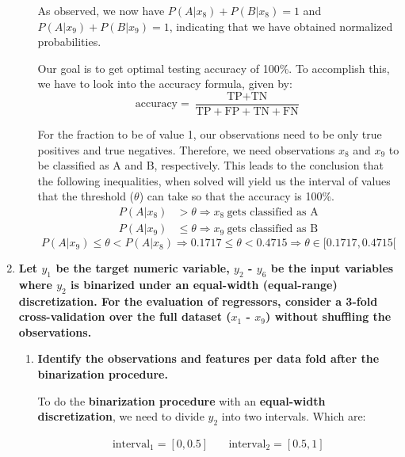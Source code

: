 \documentclass[12pt]{article}
\begin{document}
\begin{enumerate}[leftmargin=\labelsep]
\begin{enumerate}
          As observed, we now have $P(A | x_8) + P(B | x_8) = 1$ and $P(A | x_9) + P(B | x_9) = 1$, indicating that we have obtained normalized probabilities.

          Our goal is to get optimal testing accuracy of 100\%. To accomplish this, we have to look into the accuracy formula, given by:
          $$
            \text{accuracy} = \frac{\text{TP} + \text{TN}}{\text{TP} + \text{FP} + \text{TN} + \text{FN}}
          $$

          For the fraction to be of value 1, our observations need to be only true positives and true negatives. Therefore, we need observations $x_8$ and $x_9$ to be classified as A and B, respectively.
          This leads to the conclusion that the following inequalities, when solved will yield us the interval of values that the threshold ($\theta$) can take so that the accuracy is 100\%.
          \[
              \begin{aligned}
                  P(A | x_8) & > \theta \Rightarrow x_8 \ \text{gets classified as A} \\
                  P(A | x_9) & \leq \theta \Rightarrow x_9 \ \text{gets classified as B}
              \end{aligned}
          \]
          \begin{equation}
              P(A | x_9) \leq \theta < P(A | x_8) \Rightarrow 0.1717 \leq \theta < 0.4715 \Rightarrow \theta \in [0.1717, 0.4715[
          \end{equation}

          \end{enumerate}

    \item \textbf{Let $y_1$ be the target numeric variable, $y_2$ - $y_6$ be the input variables where $y_2$ is binarized under an
          equal-width (equal-range) discretization. For the evaluation of regressors, consider a 3-fold
          cross-validation over the full dataset ($x_1$ - $x_9$) without shuffling the observations.}
          \begin{enumerate}
          \item \textbf{Identify the observations and features per data fold after the binarization procedure.}

          \vskip 0.3cm
          To do the \textbf{binarization procedure} with an \textbf{equal-width discretization}, we need to divide $y_2$ into two intervals. Which are:

          \[
              \begin{array}{cc}
                  \text{interval}_1 = [0, 0.5] &\quad
                  \text{interval}_2 = [0.5, 1]
              \end{array}
          \]


\end{enumerate}
\end{enumerate}
\end{document}
